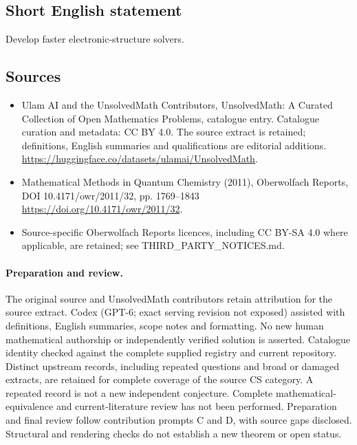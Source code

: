 \documentclass[11pt]{article}
\begin{document}
\subsection{Short English statement}
Develop faster electronic-structure solvers.
\subsection{Sources}
\begin{itemize}
\item[\hypertarget{source:statement:1}{S1}] Ulam AI and the UnsolvedMath Contributors, UnsolvedMath: A Curated Collection of Open Mathematics Problems, catalogue entry. Catalogue curation and metadata: CC BY 4.0. The source extract is retained; definitions, English summaries and qualifications are editorial additions.
\url{https://huggingface.co/datasets/ulamai/UnsolvedMath}.
\item[\hypertarget{source:statement:2}{S2}] Mathematical Methods in Quantum Chemistry (2011), Oberwolfach Reports, DOI 10.4171/owr/2011/32, pp. 1769--1843
\url{https://doi.org/10.4171/owr/2011/32}.
\item Source-specific Oberwolfach Reports licences, including CC BY-SA 4.0 where applicable, are retained; see THIRD\_PARTY\_NOTICES.md.
\end{itemize}
\paragraph{Preparation and review.}
The original source and UnsolvedMath contributors retain attribution for the source extract. Codex (GPT-6; exact serving revision not exposed) assisted with definitions, English summaries, scope notes and formatting. No new human mathematical authorship or independently verified solution is asserted. Catalogue identity checked against the complete supplied registry and current repository. Distinct upstream records, including repeated questions and broad or damaged extracts, are retained for complete coverage of the source CS category. A repeated record is not a new independent conjecture. Complete mathematical-equivalence and current-literature review has not been performed. Preparation and final review follow contribution prompts C and D, with source gaps disclosed. Structural and rendering checks do not establish a new theorem or open status.
\label{end:statement}
\end{document}
